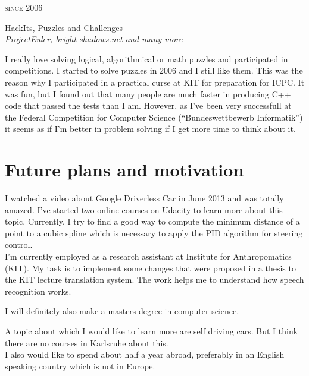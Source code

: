 \documentclass[a4paper,10pt]{article} %
\begin{document}
{\begin{minipage}[t]{0.5\textwidth}

{\raggedleft\textsc{since 2006}\par}

{\raggedright\large HackIts, Puzzles and Challenges\\
\textit{ProjectEuler, bright-shadows.net and many more}\\[5pt]}

\normalsize{I really love solving logical, algorithmical or math 
puzzles and participated in competitions. I started to solve puzzles 
in 2006 and I still like them. This was the reason why I participated 
in a practical curse at KIT for preparation for ICPC. It was fun, 
but I found out that many people are much faster in producing C++ 
code that passed the tests than I am.
However, as I've been very successfull at the Federal Competition for 
Computer Science (``Bundeswettbewerb Informatik'') it seems as if I'm 
better in problem solving if I get more time to think about it.}\\


\section{Future plans and motivation}

I watched a video about Google Driverless Car in June 2013 and was 
totally amazed. I've started two online courses on Udacity to learn
more about this topic. Currently, I try to find a good way to
compute the minimum distance of a point to a cubic spline which
is necessary to apply the PID algorithm for steering control.\\

I'm currently employed as a research assistant at Institute for Anthropomatics (KIT).
My task is to implement some changes that were proposed in a thesis 
to the KIT lecture translation system. The work helps me to understand
how speech recognition works.

I will definitely also make a masters degree in computer science. 

A topic about which I would like to learn more
are self driving cars. But I think there are no courses in Karlsruhe
about this.\\

I also would like to spend about half a year abroad, preferably
in an English speaking country which is not in Europe.




\end{minipage}}
\end{document}
